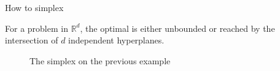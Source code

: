 \begin{frame}{How to simplex}
\begin{theorem}
For a problem in $\mathbb{R}^d$, the optimal is either unbounded or reached by the intersection of $d$ independent hyperplanes.
\end{theorem}


\begin{figure}
\caption{The simplex on the previous example}
\end{figure}  

\end{frame}

